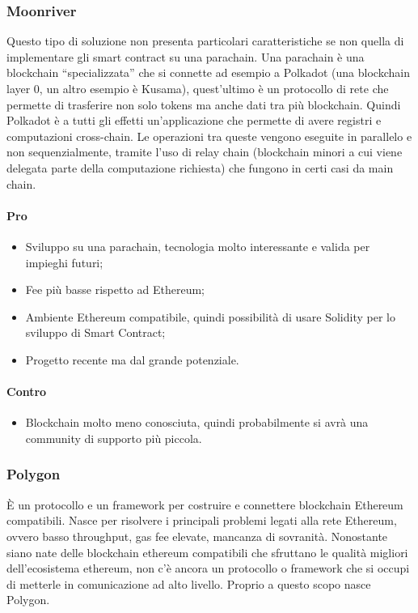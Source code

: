 		\subsubsection{Moonriver}
		Questo tipo di soluzione non presenta particolari caratteristiche se non quella di implementare gli smart contract su una parachain. Una parachain è una blockchain\glo{} “specializzata” che si connette ad esempio a Polkadot (una blockchain\glo{} layer 0\glo{}, un altro esempio è Kusama), quest'ultimo è un protocollo di rete che permette di trasferire non solo tokens ma anche dati tra più blockchain\glo{}. Quindi Polkadot è a tutti gli effetti un'applicazione che permette di avere registri e computazioni cross-chain.
		Le operazioni tra queste vengono eseguite in parallelo e non sequenzialmente, tramite l'uso di relay chain (blockchain\glo{} minori a cui viene delegata parte della computazione richiesta) che fungono in certi casi da main chain.
		\paragraph{Pro}
		\begin{itemize}
			\item Sviluppo su una parachain, tecnologia molto interessante e valida per impieghi futuri;
			\item Fee più basse rispetto ad Ethereum\glo{};
			\item Ambiente Ethereum\glo{} compatibile, quindi possibilità di usare Solidity\glo{} per lo sviluppo di Smart Contract;
			\item Progetto recente ma dal grande potenziale.
		\end{itemize}
		\paragraph{Contro}
		\begin{itemize}
			\item Blockchain\glo{} molto meno conosciuta, quindi probabilmente si avrà una community di supporto più piccola.
		\end{itemize}
		
		\subsubsection{Polygon}
		È un protocollo e un framework per costruire e connettere blockchain\glo{} Ethereum\glo{} compatibili. Nasce per risolvere i principali problemi legati alla rete Ethereum\glo{}, ovvero basso throughput, gas fee elevate, mancanza di sovranità.
		Nonostante siano nate delle blockchain\glo{} ethereum compatibili che sfruttano le qualità migliori dell'ecosistema ethereum\glo{}, non c'è ancora un protocollo o framework che si occupi di metterle in comunicazione ad alto livello. Proprio a questo scopo nasce Polygon.
	
